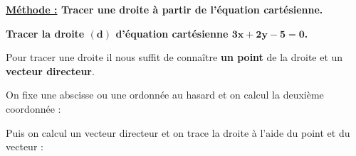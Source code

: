 \documentclass[12pt]{article}
\begin{document}
\begin{mdframed}[
    linewidth=1pt,
    roundcorner=5pt,
    linecolor=RoyalBlue,
    innertopmargin=10pt,
    innerbottommargin=10pt
]
\vspace{13pt}
\vspace{0.5cm}
{\color{black!30}\dotfill}

\vspace{0.5cm}
{\color{black!30}\dotfill}

\vspace{0.5cm}
{\color{black!30}\dotfill}

\vspace{0.5cm}
{\color{black!30}\dotfill}

\vspace{0.5cm}
{\color{black!30}\dotfill}

\vspace{0.5cm}
{\color{black!30}\dotfill}

\vspace{0.5cm}
{\color{black!30}\dotfill}

\vspace{0.5cm}
{\color{black!30}\dotfill}


\vspace{20pt}


\end{mdframed}

\vspace{10pt}
{\color{RedOrange}\textbf{\underline{Méthode :} Tracer une droite à partir de l'équation
cartésienne.}}

\vspace{5pt}
\textbf{Tracer la droite $\bm{(d)}$ d'équation cartésienne $\bm{3x + 2y - 5 = 0}$.}

\vspace{5pt}
Pour tracer une droite il nous suffit de connaître \textbf{un point} de la droite et un \textbf{vecteur directeur}.

\vspace{10pt}
\textbullet On fixe une abscisse ou une ordonnée au hasard et on calcul la deuxième
coordonnée : 

\vspace{0.5cm}
{\color{black!30}\dotfill}

\vspace{0.5cm}
{\color{black!30}\dotfill}

\vspace{0.5cm}
{\color{black!30}\dotfill}

\vspace{20pt}

Puis on calcul un vecteur directeur et on trace la droite à l'aide du point et du vecteur : 
\end{document}
